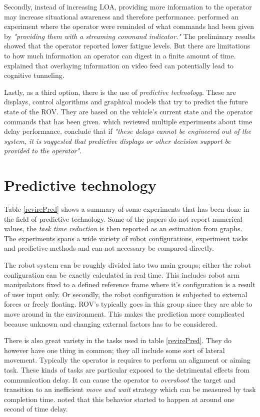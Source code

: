 Secondly, instead of increasing LOA, providing more information to the operator may increase situational awareness and therefore performance. \citep{Miller2005} performed an experiment where the operator were reminded of what commands had been given by \emph{"providing them with a streaming command indicator."} The preliminary results showed that the operator reported lower fatigue levels. But there are limitations to how much information an operator can digest in a finite amount of time. \citep{Chen2007} explained that overlaying information on video feed can potentially lead to cognitive tunneling.

Lastly, as a third option, there is the use of \emph{predictive technology}. These are displays, control algorithms and graphical models that try to predict the future state of the ROV. They are based on the vehicle's current state and the operator commands that has been given. \citep{Chen2007} which reviewed multiple experiments about time delay performance, conclude that if \emph{"these delays cannot be engineered out of the system, it is suggested that predictive displays or other decision support be provided to the operator".}


\section{Predictive technology}



Table \ref{revirePred} shows a summary of some experiments that has been done in the field of predictive technology. Some of the papers do not report numerical values, the \emph{task time reduction} is then reported as an estimation from graphs. The experiments spans a wide variety of robot configurations, experiment tasks and predictive methods and can not necessary be compared directly.

The robot system can be roughly divided into two main groups; either the robot configuration can be exactly calculated in real time. This includes robot arm manipulators fixed to a defined reference frame where it's configuration is a result of user input only. Or secondly, the robot configuration is subjected to external forces or freely floating. ROV's typically goes in this group since they are able to move around in the environment. This makes the prediction more complicated because unknown and changing external factors has to be considered.

There is also great variety in the tasks used in table \ref{revirePred}. They do however have one thing in common; they all include some sort of lateral movement. Typically the operator is requires to perform an alignment or aiming task. These kinds of tasks are particular exposed to the detrimental effects from communication delay. It can cause the operator to \emph{overshoot} the target and transition to an inefficient \emph{move and wait} strategy which can be measured by task completion time. \citep{Lane2002} noted that this behavior started to happen at around one second of time delay.

